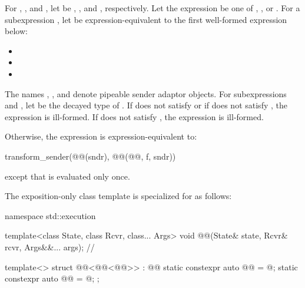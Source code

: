 \pnum
For , , and ,
let  be
, , and , respectively.
Let the expression  be one of
, , or .
For a subexpression ,
let  be expression-equivalent to
the first well-formed expression below:
\begin{itemize}
\item
{}
\item
{}
\item
{}
\end{itemize}

\pnum
The names , , and  denote
pipeable sender adaptor objects.
For subexpressions  and ,
let  be the decayed type of .
If  does not satisfy  or
if  does not satisfy ,
the expression  is ill-formed.
If  does not satisfy ,
the expression  is ill-formed.

\pnum
Otherwise,
the expression  is expression-equivalent to:
\begin{codeblock}
transform_sender(@@(sndr), @@(@@, f, sndr))
\end{codeblock}
except that  is evaluated only once.

\pnum
The exposition-only class template 
is specialized for  as follows:
\begin{codeblock}
namespace std::execution {
  template<class State, class Rcvr, class... Args>
  void @@(State& state, Rcvr& rcvr, Args&&... args);      // \expos

  template<>
  struct @@<@@<@@>> : @@ {
    static constexpr auto @@ = @\seebelow@;
    static constexpr auto @@ = @\seebelow@;
  };
}
\end{codeblock}

